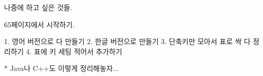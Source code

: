 나중에 하고 싶은 것들.

65페이지에서 시작하기.

1. 영어 버전으로 다 만들기
2. 한글 버전으로 만들기
3. 단축키만 모아서 표로 싹 다 정리하기
4. 표에 키 세팅 적어서 추가하기

* Java나 C++도 이렇게 정리해놓자...